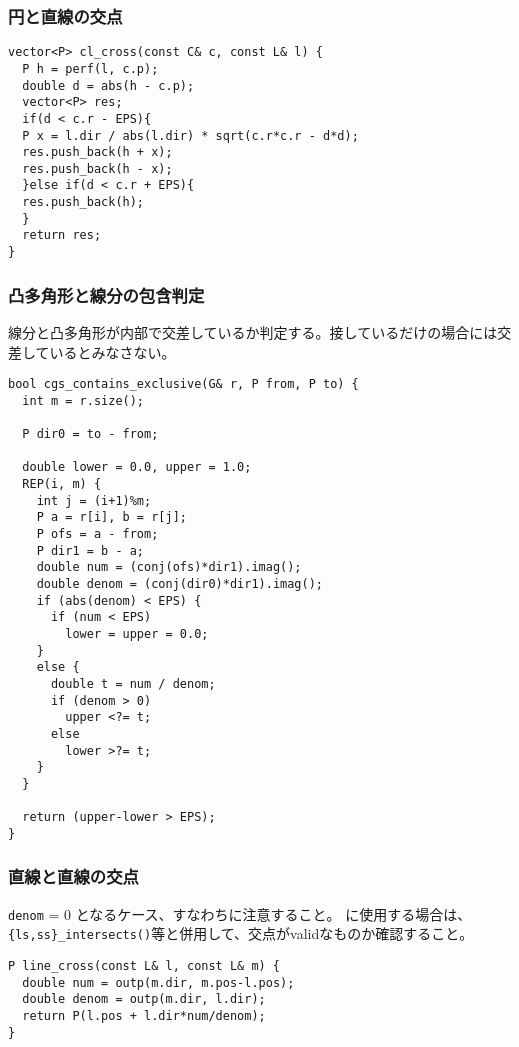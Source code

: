 \subsubsection{円と直線の交点}

\begin{lstlisting}
vector<P> cl_cross(const C& c, const L& l) {
  P h = perf(l, c.p);
  double d = abs(h - c.p);
  vector<P> res;
  if(d < c.r - EPS){
  P x = l.dir / abs(l.dir) * sqrt(c.r*c.r - d*d);
  res.push_back(h + x);
  res.push_back(h - x);
  }else if(d < c.r + EPS){
  res.push_back(h);
  }
  return res;
}
\end{lstlisting}


\subsubsection{凸多角形と線分の包含判定}

線分と凸多角形が内部で交差しているか判定する。接しているだけの場合には交
差しているとみなさない。


\begin{lstlisting}
bool cgs_contains_exclusive(G& r, P from, P to) {
  int m = r.size();

  P dir0 = to - from;

  double lower = 0.0, upper = 1.0;
  REP(i, m) {
    int j = (i+1)%m;
    P a = r[i], b = r[j];
    P ofs = a - from;
    P dir1 = b - a;
    double num = (conj(ofs)*dir1).imag();
    double denom = (conj(dir0)*dir1).imag();
    if (abs(denom) < EPS) {
      if (num < EPS)
        lower = upper = 0.0;
    }
    else {
      double t = num / denom;
      if (denom > 0)
        upper <?= t;
      else
        lower >?= t;
    }
  }

  return (upper-lower > EPS);
}
\end{lstlisting}


\subsubsection{直線と直線の交点}

\verb|denom| = 0 となるケース、すなわちに注意すること。
に使用する場合は、\verb|{ls,ss}_intersects()|等と併用して、交点がvalidなものか確認すること。

\begin{lstlisting}
P line_cross(const L& l, const L& m) {
  double num = outp(m.dir, m.pos-l.pos);
  double denom = outp(m.dir, l.dir);
  return P(l.pos + l.dir*num/denom);
}
\end{lstlisting}


